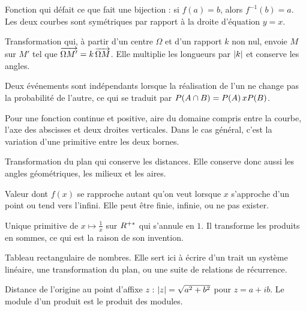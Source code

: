 
Fonction qui défait ce que fait une bijection : si $f(a) = b$, alors
$f^{-1}(b) = a$. Les deux courbes sont symétriques par rapport à la droite
d'équation $y = x$.


Transformation qui, à partir d'un centre $\Omega$ et d'un rapport $k$ non nul,
envoie $M$ sur $M'$ tel que $\overrightarrow{\Omega M'} = k\,\overrightarrow{\Omega M}$. Elle
multiplie les longueurs par $\left|k\right|$ et conserve les angles.


Deux événements sont indépendants lorsque la réalisation de l'un ne change pas
la probabilité de l'autre, ce qui se traduit par
$P\!\left(A \cap B\right) = P\!\left(A\right) x P\!\left(B\right)$.

Pour une fonction continue et positive, aire du domaine compris entre la
courbe, l'axe des abscisses et deux droites verticales. Dans le cas général,
c'est la variation d'une primitive entre les deux bornes.

Transformation du plan qui conserve les distances. Elle conserve donc aussi
les angles géométriques, les milieux et les aires.


Valeur dont $f(x)$ se rapproche autant qu'on veut lorsque $x$ s'approche d'un
point ou tend vers l'infini. Elle peut être finie, infinie, ou ne pas exister.

Unique primitive de $x \mapsto \frac1x$ sur $R^{+*}$ qui s'annule en $1$. Il
transforme les produits en sommes, ce qui est la raison de son invention.


Tableau rectangulaire de nombres. Elle sert ici à écrire d'un trait un système
linéaire, une transformation du plan, ou une suite de relations de récurrence.

Distance de l'origine au point d'affixe $z$ : $\left|z\right| = \sqrt{a^{2}+b^{2}}$
pour $z = a+ib$. Le module d'un produit est le produit des modules.


